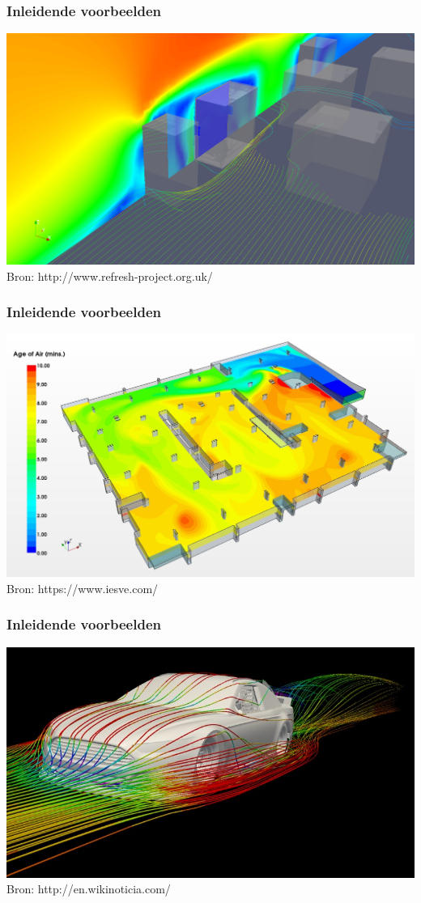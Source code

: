 \documentclass[t]{beamer}
\subtitle{Inleiding}
\begin{document}
	\frame{\titlepage}
	\begin{frame}
		\frametitle{Inleidende voorbeelden}
		\center
    	\includegraphics[height=0.7\textheight]{../fig/inleiding/building_neighbourhood_cfd}\\
		\footnotesize{Bron: http://www.refresh-project.org.uk/}
  	\end{frame}
	\begin{frame}
		\frametitle{Inleidende voorbeelden}
		\center
    	\includegraphics[height=0.7\textheight]{../fig/inleiding/ventilation_cfd}\\
		\footnotesize{Bron: https://www.iesve.com/}
  	\end{frame}
	\begin{frame}
		\frametitle{Inleidende voorbeelden}
		\center
    	\includegraphics[height=0.7\textheight]{../fig/inleiding/Ford-Fusion-CFD}\\
		\footnotesize{Bron: http://en.wikinoticia.com/}
  	\end{frame}
\end{document}
